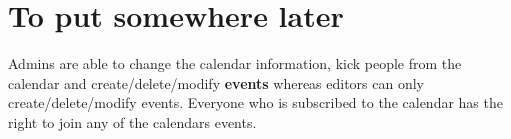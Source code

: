 \documentclass[10pt,a4paper]{article}
\begin{document}
\newpage
\newpage
\section{To put somewhere later}
Admins are able to change the calendar information, kick people from the calendar and create/delete/modify \textbf{events} whereas editors can only create/delete/modify events. Everyone who is subscribed to the calendar has the right to join any of the calendars events.
\end{document}
